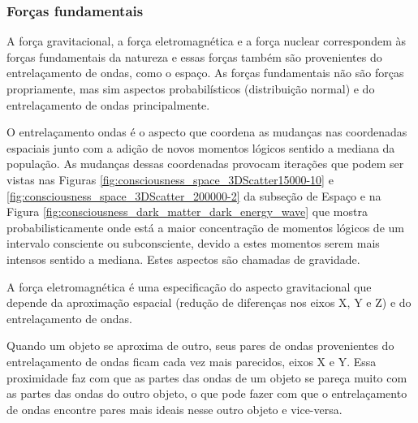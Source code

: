 \subsubsection{Forças fundamentais}
A força gravitacional, a força eletromagnética e a força nuclear correspondem às forças fundamentais da natureza e essas forças também são provenientes do entrelaçamento de ondas, como o espaço. As forças fundamentais não são forças propriamente, mas sim aspectos probabilísticos (distribuição normal) e do entrelaçamento de ondas principalmente.

O entrelaçamento ondas é o aspecto que coordena as mudanças nas coordenadas espaciais junto com a adição de novos momentos lógicos sentido a mediana da população. As mudanças dessas coordenadas provocam iterações que podem ser vistas nas Figuras \ref{fig:consciousness_space_3DScatter15000-10} e \ref{fig:consciousness_space_3DScatter_200000-2} da subseção de Espaço e na Figura \ref{fig:consciousness_dark_matter_dark_energy_wave} que mostra probabilisticamente onde está a maior concentração de momentos lógicos de um intervalo consciente ou subconsciente, devido a estes momentos serem mais intensos sentido a mediana. Estes aspectos são chamadas de gravidade.

A força eletromagnética é uma especificação do aspecto gravitacional que depende da aproximação espacial (redução de diferenças nos eixos X, Y e Z) e do entrelaçamento de ondas.

Quando um objeto se aproxima de outro, seus pares de ondas provenientes do entrelaçamento de ondas ficam cada vez mais parecidos, eixos X e Y. Essa proximidade faz com que as partes das ondas de um objeto se pareça muito com as partes das ondas do outro objeto, o que pode fazer com que o entrelaçamento de ondas encontre pares mais ideais nesse outro objeto e vice-versa.  

